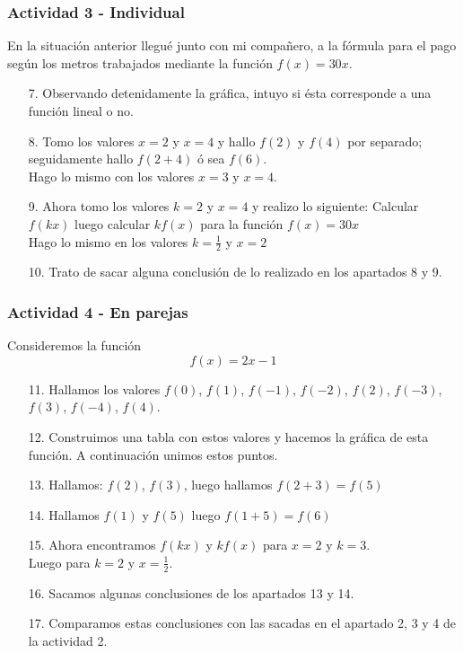 \documentclass[10pt]{article}
\begin{document}
\subsubsection*{Actividad 3 - Individual}
En la situación anterior llegué junto con mi compañero, a la fórmula para el pago según los metros trabajados mediante la función $f(x) = 30x$.
\begin{enumerate}
\item[7.] Observando detenidamente la gráfica, intuyo si ésta corresponde a una función lineal o no.
\item[8.] Tomo los valores $x =2$ y $x = 4$ y hallo $f(2)$ y $f(4)$ por separado; seguidamente hallo $f(2+4)$ ó sea $f(6)$.\\

Hago lo mismo con los valores $x = 3$ y $x = 4$.
\item[9.] Ahora tomo los valores $k = 2$ y $x =4$ y realizo lo siguiente:
Calcular $f(kx)$ luego calcular $kf(x)$ para la función $f(x)=30x$\\

Hago lo mismo en los valores $k=\frac{1}{2}$ y $x=2$
\item[10.] Trato de sacar alguna conclusión de lo realizado en los apartados 8 y 9.
\end{enumerate}
\subsubsection*{Actividad 4 - En parejas}
Consideremos la función
\[f(x)=2x-1\]
\begin{enumerate}
\item[11.] Hallamos los valores $f(0)$, $f(1)$, $f(-1)$, $f(-2)$, $f(2)$, $f(-3)$, $f(3)$, $f(-4)$, $f(4)$.
\item[12.] Construimos una tabla con estos valores y hacemos la gráfica de esta función. A continuación unimos estos puntos.
\item[13.] Hallamos: $f(2)$, $f(3)$, luego hallamos $f(2+3) = f(5)$
\item[14.] Hallamos $f(1)$ y $f(5)$ luego $f(1+5)=f(6)$
\item[15.] Ahora encontramos $f(kx)$ y $kf(x)$ para $x = 2$ y $k=3$.\\
Luego para $k=2$ y $x=\frac{1}{2}$.
\item[16.] Sacamos algunas conclusiones de los apartados 13 y 14.
\item[17.] Comparamos estas conclusiones con las sacadas en el apartado 2, 3 y 4 de la actividad 2.
\end{enumerate}
\end{document}
